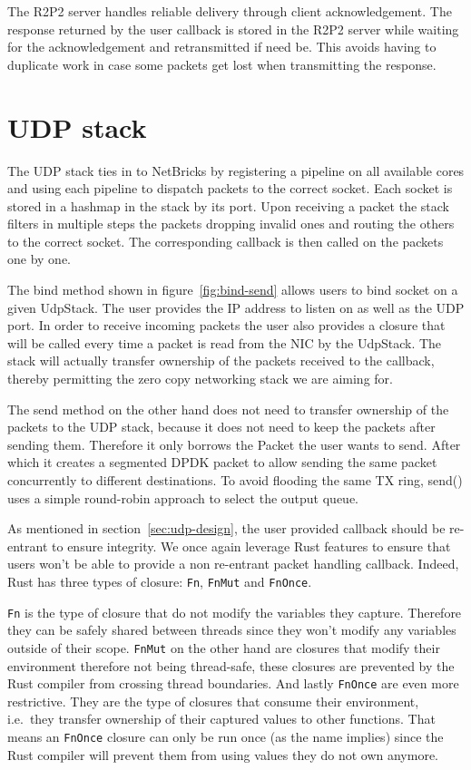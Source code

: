 The R2P2 server handles reliable delivery through client
acknowledgement. The response returned by the user callback is stored
in the R2P2 server while waiting for the acknowledgement and
retransmitted if need be. This avoids having to duplicate work in case
some packets get lost when transmitting the response.

\section{UDP stack}

The UDP stack ties in to NetBricks by registering a pipeline on all
available cores and using each pipeline to dispatch packets to the
correct socket. Each socket is stored in a hashmap in the stack by its
port. Upon receiving a packet the stack filters in multiple steps the
packets dropping invalid ones and routing the others to the correct
socket. The corresponding callback is then called on the packets one
by one.



The bind method shown in figure~\ref{fig:bind-send} allows users to
bind socket on a given UdpStack. The user provides the IP address to
listen on as well as the UDP port. In order to receive incoming
packets the user also provides a closure that will be called every
time a packet is read from the NIC by the UdpStack. The stack will
actually transfer ownership of the packets received to the callback,
thereby permitting the zero copy networking stack we are aiming for.

The send method on the other hand does not need to transfer ownership
of the packets to the UDP stack, because it does not need to keep the
packets after sending them. Therefore it only borrows the Packet the
user wants to send. After which it creates a segmented DPDK packet to
allow sending the same packet concurrently to different destinations.
To avoid flooding the same TX ring, send() uses a simple round-robin
approach to select the output queue.

As mentioned in section~\ref{sec:udp-design}, the user provided callback
should be re-entrant to ensure integrity. We once again leverage Rust
features to ensure that users won't be able to provide a non
re-entrant packet handling callback. Indeed, Rust has three types of
closure: \texttt{Fn}, \texttt{FnMut} and \texttt{FnOnce}.

\texttt{Fn} is the type of closure that do not modify the variables
they capture. Therefore they can be safely shared between threads
since they won't modify any variables outside of their
scope. \texttt{FnMut} on the other hand are closures that modify their
environment therefore not being thread-safe, these closures are
prevented by the Rust compiler from crossing thread boundaries. And
lastly \texttt{FnOnce} are even more restrictive. They are the type of
closures that consume their environment, i.e.\ they transfer ownership
of their captured values to other functions. That means an
\texttt{FnOnce} closure can only be run once (as the name implies)
since the Rust compiler will prevent them from using values they do
not own anymore.

